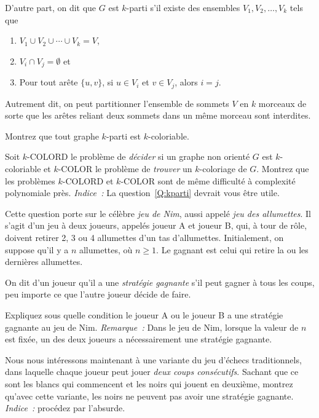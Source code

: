 \documentclass[12pt,addpoints]{exam}
\begin{document}
\begin{questions}
D'autre part, on dit que $G$ est $k$-parti s'il existe des ensembles $V_1, V_2, \ldots, V_k$ tels que
\begin{enumerate}
  \item $V_1 \cup V_2 \cup \cdots \cup V_k = V$,
  \item $V_i \cap V_j = \emptyset$ et
  \item Pour tout arête $\{u,v\}$, si $u \in V_i$ et $v \in V_j$, alors $i = j$.
\end{enumerate}
Autrement dit, on peut partitionner l'ensemble de sommets $V$ en $k$ morceaux de sorte que les arêtes reliant deux sommets dans un même morceau sont interdites.

Montrez que tout graphe $k$-parti est $k$-coloriable.

\question
Soit $k$-COLORD le problème de \emph{décider} si un graphe non orienté $G$ est $k$-coloriable et $k$-COLOR le problème de \emph{trouver} un $k$-coloriage de $G$. Montrez que les problèmes $k$-COLORD et $k$-COLOR sont de même difficulté à complexité polynomiale près. \emph{Indice~:} La question~\ref{Q:kparti} devrait vous être utile.


\question
Cette question porte sur le célèbre \emph{jeu de Nim}, aussi appelé \emph{jeu des allumettes}. Il s'agit d'un jeu à deux joueurs, appelés joueur A et joueur B, qui, à tour de rôle, doivent retirer 2, 3 ou 4 allumettes d'un tas d'allumettes. Initialement, on suppose qu'il y a $n$ allumettes, où $n \geq 1$. Le gagnant est celui qui retire la ou les dernières allumettes.

On dit d'un joueur qu'il a une \emph{stratégie gagnante} s'il peut gagner à tous les coups, peu importe ce que l'autre joueur décide de faire.

Expliquez sous quelle condition le joueur A ou le joueur B a une stratégie gagnante au jeu de Nim. \emph{Remarque~:} Dans le jeu de Nim, lorsque la valeur de $n$ est fixée, un des deux joueurs a nécessairement une stratégie gagnante.

\question
Nous nous intéressons maintenant à une variante du jeu d'échecs traditionnels, dans laquelle chaque joueur peut jouer \emph{deux coups consécutifs}. Sachant que ce sont les blancs qui commencent et les noirs qui jouent en deuxième, montrez qu'avec cette variante, les noirs ne peuvent pas avoir une stratégie gagnante. \emph{Indice~:} procédez par l'absurde.


\end{questions}
\end{document}
